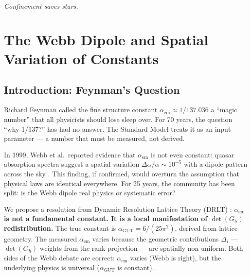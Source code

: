 \documentclass[12pt]{article}
\theoremstyle{remark}
\theoremstyle{definition}
\newcommand{\agut}{\alpha_{\mathrm{GUT}}}
\begin{document}
\begin{center}
\emph{Confinement saves stars.}
\end{center}



\section{The Webb Dipole and Spatial Variation of Constants}
\label{ch:webb_dipole}

\subsection{Introduction: Feynman's Question}

Richard Feynman called the fine structure constant $\alpha_\text{em} \approx 1/137.036$ a ``magic number'' that all physicists should lose sleep over. For 70 years, the question ``why 1/137?'' has had no answer. The Standard Model treats it as an input parameter --- a number that must be measured, not derived.

In 1999, Webb et al.\ reported evidence that $\alpha_\text{em}$ is not even constant: quasar absorption spectra suggest a spatial variation $\Delta\alpha/\alpha \sim 10^{-5}$ with a dipole pattern across the sky \cite{Webb}. This finding, if confirmed, would overturn the assumption that physical laws are identical everywhere. For 25 years, the community has been split: is the Webb dipole real physics or systematic error?

We propose a resolution from Dynamic Resolution Lattice Theory (DRLT) : \textbf{$\alpha_\text{em}$ is not a fundamental constant. It is a local manifestation of $\det(G_h)$ redistribution.} The true constant is $\agut = 6/(25\pi^2)$, derived from lattice geometry. The measured $\alpha_\text{em}$ varies because the geometric contributions $\Delta_i$ --- $\det(G_h)$ weights from the rank projection --- are spatially non-uniform. Both sides of the Webb debate are correct: $\alpha_\text{em}$ varies (Webb is right), but the underlying physics is universal ($\agut$ is constant).
\end{document}
